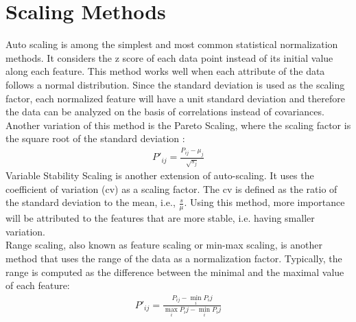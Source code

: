 \section{Scaling Methods}
\indent Auto scaling is among the simplest and most common statistical normalization methods. It considers the z score of each data point instead of its initial value along each feature. This method works well when each attribute of the data follows a normal distribution. Since the standard deviation is used as the scaling factor, each normalized feature will have a unit standard deviation and therefore the data can be analyzed on the basis of correlations instead of covariances. Another variation of this method is the Pareto Scaling, where the scaling factor is the square root of the standard deviation \cite{berg:tar}: 
\begin{eqnarray}
P'_{ij}= \frac{P_{ij} - \mu_j}{\sqrt{s_j}}
\end{eqnarray}
Variable Stability Scaling \cite{berg:tar} is another extension of auto-scaling. It uses the coefficient of variation (cv) as a scaling factor. The  cv is defined as the ratio of the standard deviation to the mean, i.e., $ \frac{s}{\mu}$. Using this method, more importance will be attributed to the features that are more stable, i.e. having smaller variation.\\
\indent Range scaling, also known as feature scaling or min-max scaling, is another method that uses the range of the data as a normalization factor. Typically, the range is computed as the difference between the minimal and the maximal value of each feature:
\begin{eqnarray}
P'_{ij}= \frac{P_{ij} - \min_i{P_ij}}{\max_{i}{P_ij}- \min_{i}{P_ij}}
\end{eqnarray}
